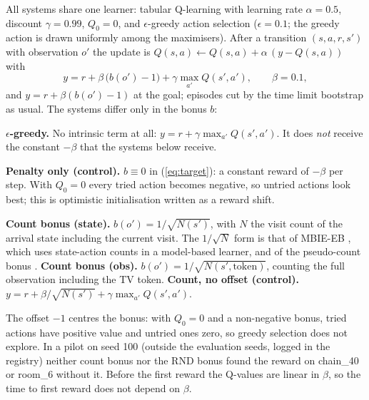 All systems share one learner: tabular Q-learning with learning rate $\alpha=0.5$, discount $\gamma=0.99$, $Q_0=0$, and $\epsilon$-greedy action selection ($\epsilon=0.1$; the greedy action is drawn uniformly among the maximisers). After a transition $(s,a,r,s')$ with observation $o'$ the update is $Q(s,a)\leftarrow Q(s,a)+\alpha\,(y-Q(s,a))$ with
\begin{equation}
y = r + \beta\,\big(b(o') - 1\big) + \gamma \max_{a'} Q(s',a'),\qquad \beta=0.1,\label{eq:target}
\end{equation}
and $y=r+\beta(b(o')-1)$ at the goal; episodes cut by the time limit bootstrap as usual. The systems differ only in the bonus $b$:

\textbf{$\epsilon$-greedy.} No intrinsic term at all: $y=r+\gamma\max_{a'}Q(s',a')$. It does \emph{not} receive the constant $-\beta$ that the systems below receive.

\textbf{Penalty only (control).} $b\equiv0$ in (\ref{eq:target}): a constant reward of $-\beta$ per step. With $Q_0=0$ every tried action becomes negative, so untried actions look best; this is optimistic initialisation \cite{rashid2020optimistic} written as a reward shift.

\textbf{Count bonus (state).} $b(o')=1/\sqrt{N(s')}$, with $N$ the visit count of the arrival state including the current visit. The $1/\sqrt{N}$ form is that of MBIE-EB \cite{strehl2008analysis}, which uses state-action counts in a model-based learner, and of the pseudo-count bonus \cite{bellemare2016unifying}. \textbf{Count bonus (obs).} $b(o')=1/\sqrt{N(s',\text{token})}$, counting the full observation including the TV token. \textbf{Count, no offset (control).} $y=r+\beta/\sqrt{N(s')}+\gamma\max_{a'}Q(s',a')$.

The offset $-1$ centres the bonus: with $Q_0=0$ and a non-negative bonus, tried actions have positive value and untried ones zero, so greedy selection does not explore. In a pilot on seed 100 (outside the evaluation seeds, logged in the registry) neither count bonus nor the RND bonus found the reward on chain\_40 or room\_6 without it. Before the first reward the Q-values are linear in $\beta$, so the time to first reward does not depend on $\beta$.


